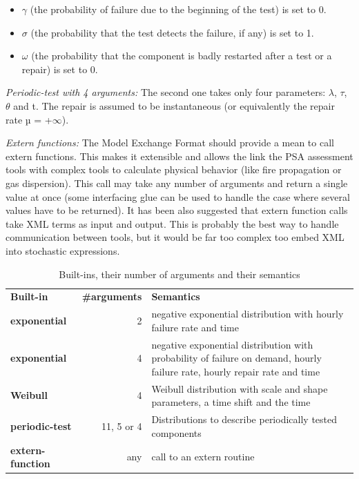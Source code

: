 \documentclass[11pt]{article}
\begin{document}
\begin{itemize}
\item \(\gamma\) (the probability of failure due to the beginning of the test) is
set to 0.

\item \(\sigma\) (the probability that the test detects the failure, if any) is set
to 1.

\item \(\omega\) (the probability that the component is badly restarted after a test
or a repair) is set to 0.
\end{itemize}

\emph{Periodic-test with 4 arguments:}  The second one takes only four
parameters: \(\lambda\), \(\tau\), \(\theta\) and t. The repair is assumed to be instantaneous (or
equivalently the repair rate µ = +\(\infty\)).

\emph{Extern functions:} The Model Exchange Format should provide a mean to
call extern functions. This makes it extensible and allows the link the
PSA assessment tools with complex tools to calculate physical behavior
(like fire propagation or gas dispersion). This call may take any number
of arguments and return a single value at once (some interfacing glue
can be used to handle the case where several values have to be
returned). It has been also suggested that extern function calls take
XML terms as input and output. This is probably the best way to handle
communication between tools, but it would be far too complex too embed
XML into stochastic expressions.


\begin{table}[htbp]
\caption{Built-ins, their number of arguments and their semantics \label{TableV-4}}
\centering
\begin{tabular}{lrl}
\textbf{Built-in} & \textbf{\#arguments} & \textbf{Semantics}\\
\textbf{exponential} & 2 & negative exponential distribution with hourly failure rate and time\\
\textbf{exponential} & 4 & negative exponential distribution with probability of failure on demand, hourly failure rate, hourly repair rate and time\\
\textbf{Weibull} & 4 & Weibull distribution with scale and shape parameters, a time shift and the time\\
\textbf{periodic-test} & 11, 5 or 4 & Distributions to describe periodically tested components\\
\textbf{extern-function} & any & call to an extern routine\\
\end{tabular}
\end{table}
\end{document}
